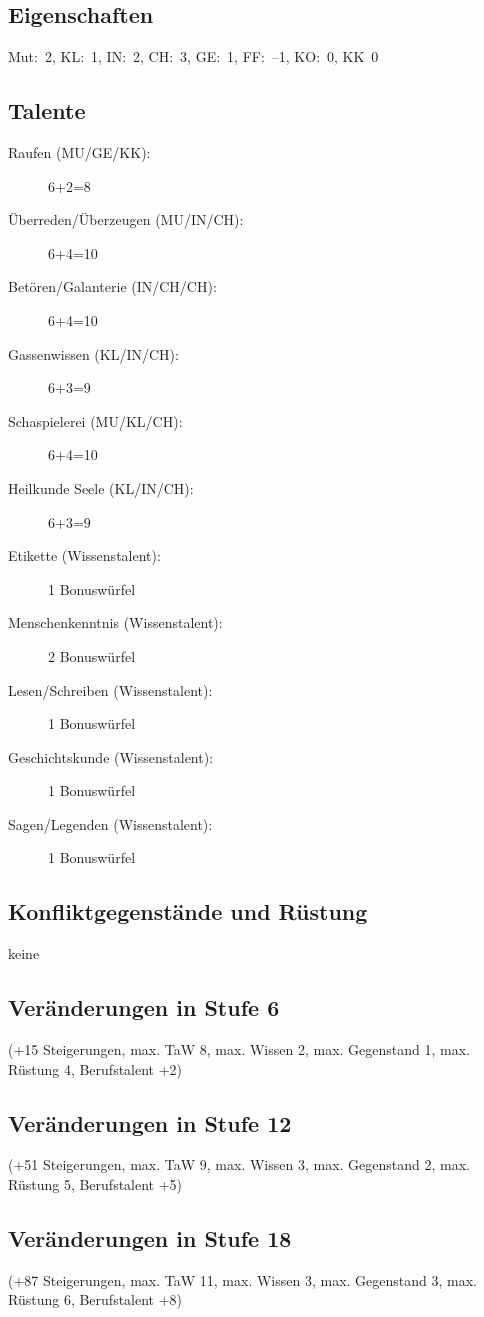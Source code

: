 \subsection{Eigenschaften}
Mut:~2, KL:~1, IN:~2, CH:~3, GE:~1, FF:~--1, KO:~0, KK~0

\subsection{Talente}
\begin{description}
\item[Raufen (MU/GE/KK):] 6+2=8
\item[Überreden/Überzeugen (MU/IN/CH):] 6+4=10
\item[Betören/Galanterie (IN/CH/CH):] 6+4=10
\item[Gassenwissen (KL/IN/CH):] 6+3=9
\item[Schaspielerei (MU/KL/CH):] 6+4=10
\item[Heilkunde Seele (KL/IN/CH):] 6+3=9
\item[Etikette (Wissenstalent):] 1 Bonuswürfel
\item[Menschenkenntnis (Wissenstalent):] 2 Bonuswürfel
\item[Lesen/Schreiben (Wissenstalent):] 1 Bonuswürfel
\item[Geschichtskunde (Wissenstalent):] 1 Bonuswürfel
\item[Sagen/Legenden (Wissenstalent):] 1 Bonuswürfel
\end{description}

\subsection{Konfliktgegenstände und Rüstung}
keine


\subsection{Veränderungen in Stufe 6}
(+15 Steigerungen, max. TaW 8, max. Wissen 2, max. Gegenstand 1, max. Rüstung 4, Berufstalent +2)

\subsection{Veränderungen in Stufe 12}
(+51 Steigerungen, max. TaW 9, max. Wissen 3, max. Gegenstand 2, max. Rüstung 5, Berufstalent +5)

\subsection{Veränderungen in Stufe 18}
(+87 Steigerungen, max. TaW 11, max. Wissen 3, max. Gegenstand 3, max. Rüstung 6, Berufstalent +8)

